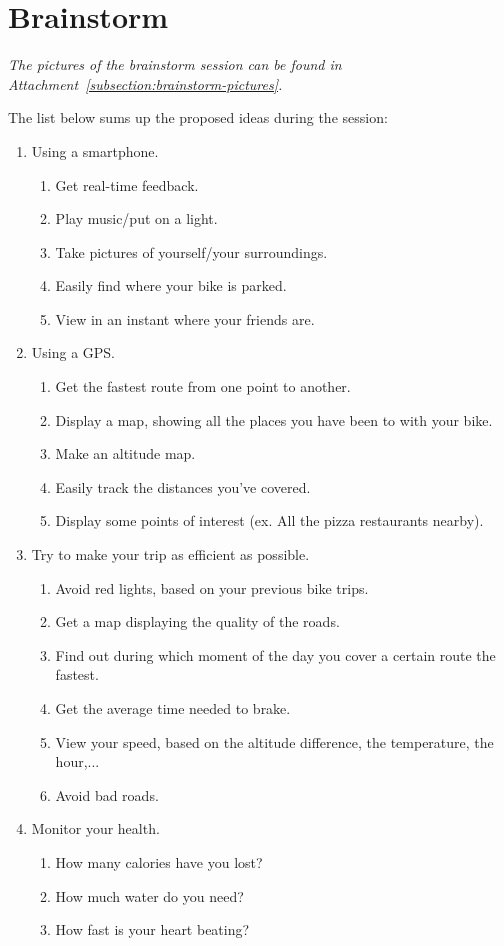\section{Brainstorm}
\textit{The pictures of the brainstorm session can be found in Attachment~\ref{subsection:brainstorm-pictures}.}

The list below sums up the proposed ideas during the session:
\begin{enumerate}
 \item Using a smartphone.
  \begin{enumerate}
   \item Get real-time feedback.
   \item Play music/put on a light.
   \item Take pictures of yourself/your surroundings.
   \item Easily find where your bike is parked.
   \item View in an instant where your friends are.
  \end{enumerate}
 \item Using a GPS.
  \begin{enumerate}
   \item Get the fastest route from one point to another.
   \item Display a map, showing all the places you have been to with your bike. 
   \item Make an altitude map.
   \item Easily track the distances you've covered.
   \item Display some points of interest (ex. All the pizza restaurants nearby).
  \end{enumerate}
 \item Try to make your trip as efficient as possible.
  \begin{enumerate}
   \item Avoid red lights, based on your previous bike trips.
   \item Get a map displaying the quality of the roads.
   \item Find out during which moment of the day you cover a certain route the fastest.
   \item Get the average time needed to brake.
   \item View your speed, based on the altitude difference, the temperature, the hour,...
   \item Avoid bad roads.
  \end{enumerate}
 \item Monitor your health.
  \begin{enumerate}
   \item How many calories have you lost?
   \item How much water do you need?
   \item How fast is your heart beating?
  \end{enumerate}
\end{enumerate}


